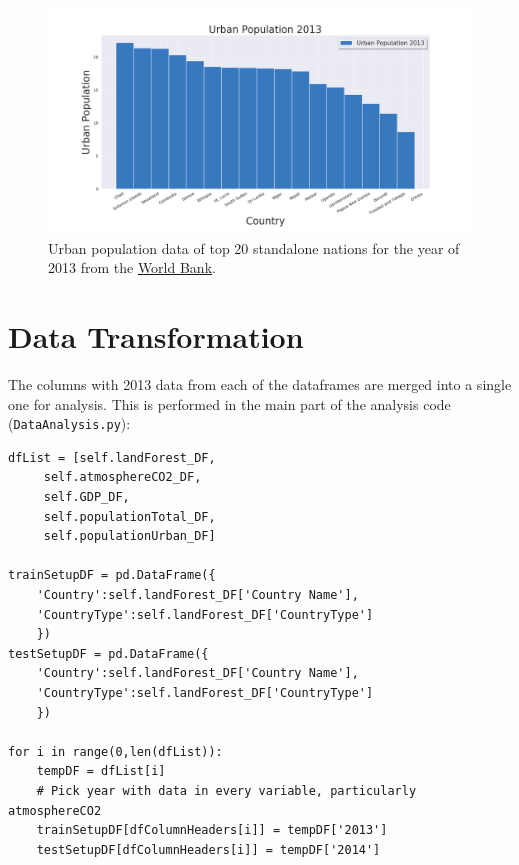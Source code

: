 \documentclass[11pt,a4paper,titlepage]{article}
\newcommand{\blankline}{\quad\pagebreak[2]}
\begin{document}
\begin{figure}[!htbp]
    \begin{center}
        \includegraphics[width=\textwidth]{../Plots/populationUrban_2013_bottom.png}
        \caption{Urban population data of top 20 standalone nations for the year of 2013 from the \href{https://www.worldbank.org/}{World Bank}.}
        \label{fig:populationUrbanBottom2013}
    \end{center}
\end{figure}

\section{Data Transformation}

The columns with 2013 data from each of the dataframes are merged into a single one for analysis. This is performed in the main part of the analysis code (\texttt{DataAnalysis.py}):

\begin{verbatim}
dfList = [self.landForest_DF,
     self.atmosphereCO2_DF,
     self.GDP_DF,
     self.populationTotal_DF,
     self.populationUrban_DF]

trainSetupDF = pd.DataFrame({
    'Country':self.landForest_DF['Country Name'],
    'CountryType':self.landForest_DF['CountryType']
    })
testSetupDF = pd.DataFrame({
    'Country':self.landForest_DF['Country Name'],
    'CountryType':self.landForest_DF['CountryType']
    })

for i in range(0,len(dfList)):
    tempDF = dfList[i]
    # Pick year with data in every variable, particularly atmosphereCO2
    trainSetupDF[dfColumnHeaders[i]] = tempDF['2013']
    testSetupDF[dfColumnHeaders[i]] = tempDF['2014']
\end{verbatim}

\blankline
\end{document}
